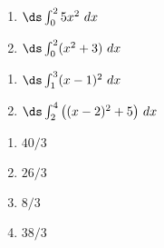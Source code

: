 {\noindent
\begin{minipage}{\linewidth}
\end{minipage}
\noindent\begin{minipage}[t]{.49\linewidth}
\begin{enumerate}
\item		$\ds \int_{0}^{2} 5x^2\ dx$
\item		$\ds \int_0^2 (x^2+3)\ dx$
\end{enumerate}
\end{minipage}
\begin{minipage}[t]{.49\linewidth}
\begin{enumerate}\addtocounter{enumii}{2}
\item		$\ds \int_{1}^3 (x-1)^2\ dx$
\item		$\ds \int_2^4 \big((x-2)^2+5\big)\ dx$
\end{enumerate}
\end{minipage}
}
{\begin{enumerate}
\item		$40/3$
\item		$26/3$
\item		$8/3$
\item		$38/3$
\end{enumerate}
}


